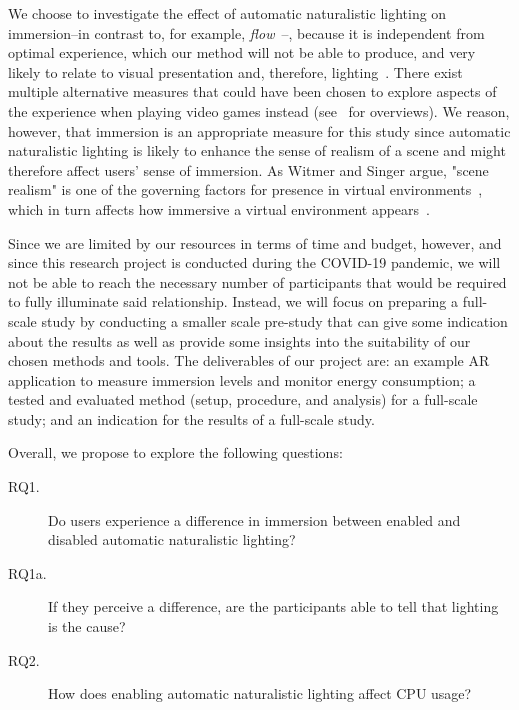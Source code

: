 \documentclass[12pt,twoside,english]{article}
\begin{document}
We choose to investigate the effect of automatic naturalistic lighting on immersion--in contrast to, for example, \textit{flow}~\cite{csikszentmihalyi_flow_1990}--, because it is independent from optimal experience, which our method will not be able to produce, and very likely to relate to visual presentation and, therefore, lighting~\cite{jennett_measuring_2008}.
There exist multiple alternative measures that could have been chosen to explore aspects of the experience when playing video games instead (see~\cite{dey_systematic_2018, dunser_survey_2008} for overviews).
We reason, however, that immersion is an appropriate measure for this study since automatic naturalistic lighting is likely to enhance the sense of realism of a scene and might therefore affect users' sense of immersion.
As Witmer and Singer argue, "scene realism" is one of the governing factors for presence in virtual environments~\cite{witmer_measuring_1998}, which in turn affects how immersive a virtual environment appears~\cite{jennett_measuring_2008}.

Since we are limited by our resources in terms of time and budget, however, and since this research project is conducted during the COVID-19 pandemic, we will not be able to reach the necessary number of participants that would be required to fully illuminate said relationship.
Instead, we will focus on preparing a full-scale study by conducting a smaller scale pre-study that can give some indication about the results as well as provide some insights into the suitability of our chosen methods and tools.
The deliverables of our project are: an example \gls{AR} application to measure immersion levels and monitor energy consumption; a tested and evaluated method (setup, procedure, and analysis) for a full-scale study; and an indication for the results of a full-scale study.


Overall, we propose to explore the following questions:

\begin{description}
    \item[RQ1.] Do users experience a difference in immersion between enabled and disabled automatic naturalistic lighting?
    \item[RQ1a.] If they perceive a difference, are the participants able to tell that lighting is the cause?
    \item[RQ2.] How does enabling automatic naturalistic lighting affect \gls{CPU} usage?
\end{description}
\end{document}
